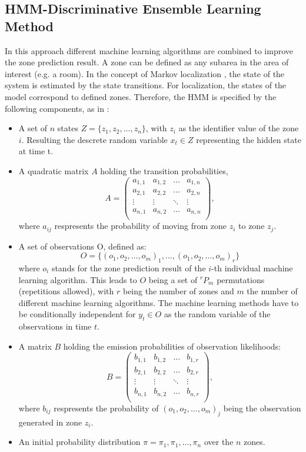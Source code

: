 \subsection{HMM-Discriminative Ensemble Learning Method}
In this approach different machine learning algorithms are combined to improve the zone prediction result. A zone can be defined as any subarea in the area of interest (e.g. a room). In the concept of Markov localization \cite{Markov}, the state of the system is estimated by the state transitions. For localization, the states of the model correspond to defined zones.
Therefore, the HMM is specified by the following components, as in \cite{Carrera2}:
\begin{itemize}
\item A set of $n$ states $Z=\{z_{1}, z_{2},\dots,z_{n}\}$, with $z_{i}$ as the identifier value of the zone $i$. Resulting the descrete random variable $x_{t} \in Z$ representing the hidden state at time t.
\item A quadratic matrix $A$ holding the transition probabilities,
\begin{equation*}
A = 
\begin{pmatrix}
   a_{1,1} & a_{1,2} & \dots & a_{1,n}\\
   a_{2,1} & a_{2,2} & \dots & a_{2,n}\\
    \vdots & \vdots & \ddots & \vdots  \\
   a_{n,1} & a_{n,2} & \dots & a_{n,n}\\
\end{pmatrix},
\end{equation*}
where $a_{ij}$ respresents the probability of moving from zone $z_{i}$ to zone $z_{j}$.
\item A set of observations O, defined as:
$$O = \{(o_{1},o_{2},\dots,o_{m})_1, \dots, (o_{1},o_{2},\dots,o_{m})_r\}$$
where $o_{i}$ stands for the zone prediction result of the $i$-th individual machine learning algorithm. This leads to $O$ being a set of $^rP_m$ permutations (repetitions allowed), with $r$ being the number of zones and $m$ the number of different machine learning algorithms. The machine learning methods have to be conditionally independent for $y_{t} \in O$ as the random variable of the observations in time $t$.
\item A matrix $B$ holding the emission probabilities of observation likelihoods:
\begin{equation*}
B = 
\begin{pmatrix}
   b_{1,1} & b_{1,2} & \dots & b_{1,r}\\
   b_{2,1} & b_{2,2} & \dots & b_{2,r}\\
    \vdots & \vdots & \ddots & \vdots  \\
   b_{n,1} & b_{n,2} & \dots & b_{n,r}\\
\end{pmatrix},
\end{equation*}
where $b_{ij}$ respresents the probability of $(o_{1},o_{2}, \dots, o_{m})_j$ being the observation generated in zone $z_{i}$.
\item An initial probability distribution $\pi = \pi_{1},\pi_{1},\dots, \pi_{n}$ over the $n$ zones.
\end{itemize}
